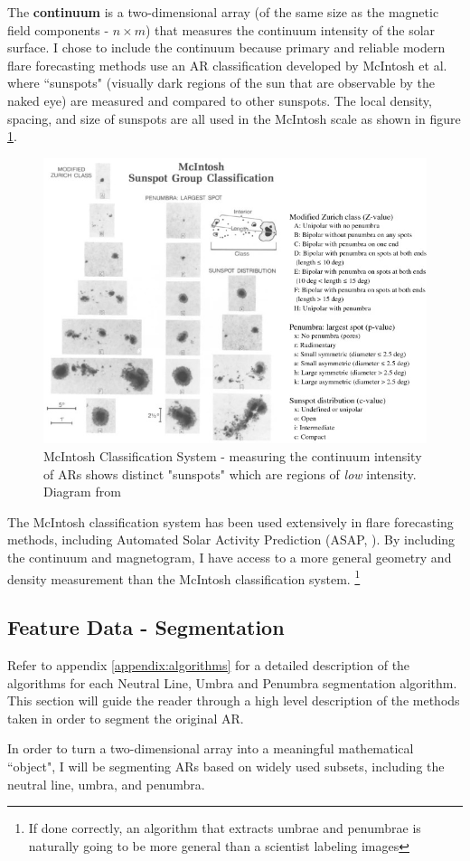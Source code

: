 The \textbf{continuum} is a two-dimensional array (of the same size as the magnetic field components - $n \times m$) that measures the continuum intensity of the solar surface. I chose to include the continuum because primary and reliable modern flare forecasting methods use an AR classification developed by McIntosh et al. \cite{MCintosh} where ``sunspots" (visually dark regions of the sun that are observable by the naked eye) are measured and compared to other sunspots. The local density, spacing, and size of sunspots are all used in the McIntosh scale as shown in figure \ref{fig:mcintoshclass}. 
\begin{figure}[h]
\centering
\includegraphics[width=0.5\linewidth]{ThesisFilePkg/figures/data/mcintosh.jpg}
\caption{McIntosh Classification System - measuring the continuum intensity of ARs shows distinct "sunspots" which are regions of \textit{low} intensity. Diagram from \cite{MCintosh}}
\label{fig:mcintoshclass}
\end{figure}
The McIntosh classification system has been used extensively in flare forecasting methods, including Automated Solar Activity Prediction (ASAP, \cite{ASAP}). By including the continuum and magnetogram, I have access to a more general geometry and density measurement than the McIntosh classification system. \footnote{If done correctly, an algorithm that extracts umbrae and penumbrae is naturally going to be more general than a scientist labeling images}

\subsection{Feature Data - Segmentation}
\label{subregions}
Refer to appendix \ref{appendix:algorithms} for a detailed description of the algorithms for each Neutral Line, Umbra and Penumbra segmentation algorithm. This section will guide the reader through a high level description of the methods taken in order to segment the original AR. 

In order to turn a two-dimensional array into a meaningful mathematical ``object", I will be segmenting ARs based on widely used subsets, including the neutral line, umbra, and penumbra.

